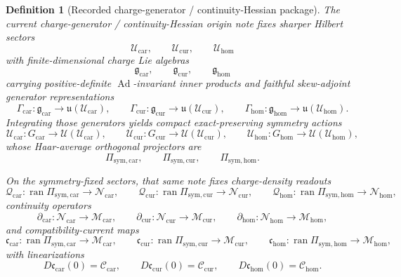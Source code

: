 \documentclass[11pt]{article}
\newcommand{\RootTensorClass}{\mathscr U_{\mathrm{car}}}
\newcommand{\RootRelabelClass}{\mathscr U_{\mathrm{cur}}}
\newcommand{\RootFreeClass}{\mathscr U_{\mathrm{hom}}}
\newcommand{\TensorSymProj}{\Pi_{\mathrm{sym,car}}}
\newcommand{\CurSymProj}{\Pi_{\mathrm{sym,cur}}}
\newcommand{\HomSymProj}{\Pi_{\mathrm{sym,hom}}}
\newcommand{\TensorCompat}{\mathcal C_{\mathrm{car}}}
\newcommand{\CurCompat}{\mathcal C_{\mathrm{cur}}}
\newcommand{\HomCompat}{\mathcal C_{\mathrm{hom}}}
\newcommand{\TensorSymGroup}{G_{\mathrm{car}}}
\newcommand{\CurSymGroup}{G_{\mathrm{cur}}}
\newcommand{\HomSymGroup}{G_{\mathrm{hom}}}
\newcommand{\TensorSymAct}{\mathscr U_{\mathrm{car}}}
\newcommand{\CurSymAct}{\mathscr U_{\mathrm{cur}}}
\newcommand{\HomSymAct}{\mathscr U_{\mathrm{hom}}}
\newcommand{\TensorCurrent}{\mathfrak c_{\mathrm{car}}}
\newcommand{\CurCurrent}{\mathfrak c_{\mathrm{cur}}}
\newcommand{\HomCurrent}{\mathfrak c_{\mathrm{hom}}}
\newcommand{\TensorChargeAlg}{\mathfrak g_{\mathrm{car}}}
\newcommand{\CurChargeAlg}{\mathfrak g_{\mathrm{cur}}}
\newcommand{\HomChargeAlg}{\mathfrak g_{\mathrm{hom}}}
\newcommand{\TensorGen}{\Gamma_{\mathrm{car}}}
\newcommand{\CurGen}{\Gamma_{\mathrm{cur}}}
\newcommand{\HomGen}{\Gamma_{\mathrm{hom}}}
\newcommand{\TensorDensityClass}{\mathscr N_{\mathrm{car}}}
\newcommand{\CurDensityClass}{\mathscr N_{\mathrm{cur}}}
\newcommand{\HomDensityClass}{\mathscr N_{\mathrm{hom}}}
\newcommand{\TensorDensity}{\mathcal Q_{\mathrm{car}}}
\newcommand{\CurDensity}{\mathcal Q_{\mathrm{cur}}}
\newcommand{\HomDensity}{\mathcal Q_{\mathrm{hom}}}
\newcommand{\TensorCont}{\partial_{\mathrm{car}}}
\newcommand{\CurCont}{\partial_{\mathrm{cur}}}
\newcommand{\HomCont}{\partial_{\mathrm{hom}}}
\newtheorem{definition}{Definition}
\begin{document}
\begin{definition}[Recorded charge-generator / continuity-Hessian package]
\label{def:recorded_layer}
The current charge-generator / continuity-Hessian origin note fixes sharper Hilbert sectors
\[
\RootTensorClass,\qquad
\RootRelabelClass,\qquad
\RootFreeClass
\]
with finite-dimensional charge Lie algebras
\[
\TensorChargeAlg,\qquad
\CurChargeAlg,\qquad
\HomChargeAlg
\]
carrying positive-definite \(\operatorname{Ad}\)-invariant inner products and faithful skew-adjoint generator representations
\[
\TensorGen:\TensorChargeAlg\to\mathfrak u(\RootTensorClass),\qquad
\CurGen:\CurChargeAlg\to\mathfrak u(\RootRelabelClass),\qquad
\HomGen:\HomChargeAlg\to\mathfrak u(\RootFreeClass).
\]
Integrating those generators yields compact exact-preserving symmetry actions
\[
\TensorSymAct:\TensorSymGroup\to\mathcal U(\RootTensorClass),\qquad
\CurSymAct:\CurSymGroup\to\mathcal U(\RootRelabelClass),\qquad
\HomSymAct:\HomSymGroup\to\mathcal U(\RootFreeClass),
\]
whose Haar-average orthogonal projectors are
\[
\TensorSymProj,\qquad
\CurSymProj,\qquad
\HomSymProj.
\]

On the symmetry-fixed sectors, that same note fixes charge-density readouts
\[
\TensorDensity:\operatorname{ran}\TensorSymProj\to\TensorDensityClass,\qquad
\CurDensity:\operatorname{ran}\CurSymProj\to\CurDensityClass,\qquad
\HomDensity:\operatorname{ran}\HomSymProj\to\HomDensityClass,
\]
continuity operators
\[
\TensorCont:\TensorDensityClass\to\mathscr M_{\mathrm{car}},\qquad
\CurCont:\CurDensityClass\to\mathscr M_{\mathrm{cur}},\qquad
\HomCont:\HomDensityClass\to\mathscr M_{\mathrm{hom}},
\]
and compatibility-current maps
\[
\TensorCurrent:\operatorname{ran}\TensorSymProj\to\mathscr M_{\mathrm{car}},\qquad
\CurCurrent:\operatorname{ran}\CurSymProj\to\mathscr M_{\mathrm{cur}},\qquad
\HomCurrent:\operatorname{ran}\HomSymProj\to\mathscr M_{\mathrm{hom}},
\]
with linearizations
\begin{equation}
D\TensorCurrent(0)=\TensorCompat,\qquad
D\CurCurrent(0)=\CurCompat,\qquad
D\HomCurrent(0)=\HomCompat.
\label{eq:recorded_compat_linearizations}
\end{equation}


\end{definition}
\end{document}
